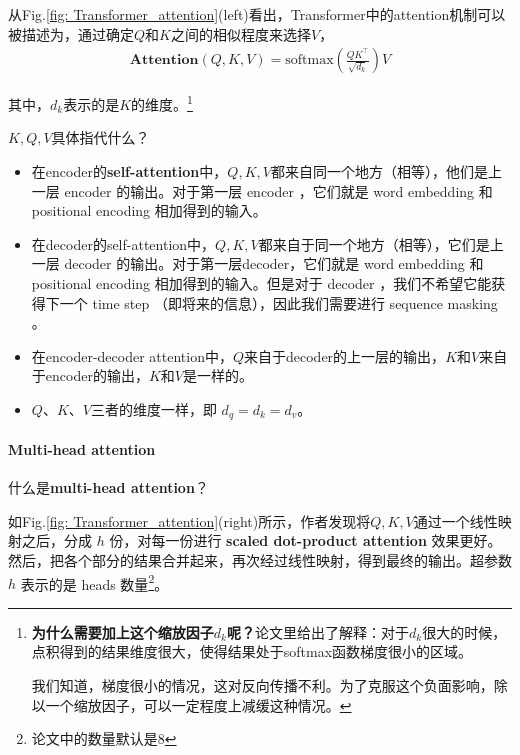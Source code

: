 \documentclass[letterpaper,10pt]{article}
\begin{document}
	从Fig.\ref{fig: Transformer_attention}(left)看出，Transformer中的attention机制可以被描述为，通过确定$Q$和$K$之间的相似程度来选择$V$，
	\begin{equation}
		\begin{aligned}
			\textbf{Attention}(Q,K,V)=\text{softmax}(\frac{QK^\top}{\sqrt{d_k}})V
		\end{aligned}
		\label{eq: Transformer_attention}
	\end{equation}
	
	其中，$d_k$表示的是$K$的维度。\footnote{\textbf{为什么需要加上这个缩放因子$d_k$呢？}论文里给出了解释：对于$d_k$很大的时候，点积得到的结果维度很大，使得结果处于softmax函数梯度很小的区域。
		
	我们知道，梯度很小的情况，这对反向传播不利。为了克服这个负面影响，除以一个缩放因子，可以一定程度上减缓这种情况。}
	
	$K, Q, V$具体指代什么？
	\begin{itemize}
		\item {}
		
			在encoder的\textbf{self-attention}中，$Q, K, V$都来自同一个地方（相等），他们是上一层 encoder 的输出。对于第一层 encoder ，它们就是 word embedding 和 positional encoding 相加得到的输入。
		
		\item {}
		
			在decoder的self-attention中，$Q, K, V$都来自于同一个地方（相等），它们是上一层 decoder 的输出。对于第一层decoder，它们就是 word embedding 和 positional encoding 相加得到的输入。但是对于 decoder ，我们不希望它能获得下一个 time step （即将来的信息），因此我们需要进行 sequence masking 。

		\item {}
		
			在encoder-decoder attention中，$Q$来自于decoder的上一层的输出，$K$和$V$来自于encoder的输出，$K$和$V$是一样的。
			
		\item {}
			
			$Q$、$K$、$V$三者的维度一样，即 $d_q=d_k=d_v$。
	\end{itemize}
	
	\paragraph{Multi-head attention}
	
	什么是\textbf{multi-head attention}？
	
	如Fig.\ref{fig: Transformer_attention}(right)所示，作者发现将$Q,K,V$通过一个线性映射之后，分成 $h$ 份，对每一份进行 \textbf{scaled dot-product attention} 效果更好。然后，把各个部分的结果合并起来，再次经过线性映射，得到最终的输出。超参数 $h$ 表示的是 heads 数量\footnote{论文中的数量默认是8}。
	
\end{document}
